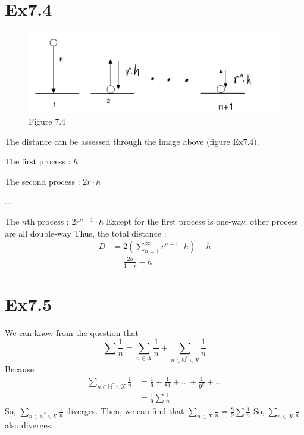 \documentclass[11pt,twoside,a4paper]{article}
\begin{document}
\section{Ex7.4}
\begin{figure}[H]
    \centering
    \includegraphics[scale=0.5]{Ex7.4.png}
    \caption{Figure 7.4}
    \end{figure}
The distance can be assessed through the image above (figure Ex7.4).
\par 
The first process : $h$
\par 
The second process : $2r\cdot h$
\par 
$. . .$
\par 
The $n$th process : $2r^{n-1}\cdot h$
\newline
Except for the first process is one-way, other process are all double-way
Thus, the total distance :
\begin{equation}
    \begin{aligned}
        D&=2(\sum_{n = 1}^{\infty} r^{n-1} \cdot h)-h\\
        &=\frac{2h}{1-r}-h
    \end{aligned}
    \end{equation}

\section{Ex7.5}
We can know from the question that 
$$\displaystyle \sum \frac{1}{n}= \sum _{n\in X} \frac{1}{n} +\sum _{n \in \mathbb{N}^* \backslash X} \frac{1}{n}$$
Because 
\begin{equation}
    \begin{aligned}
        \displaystyle \sum _{n \in \mathbb{N}^* \backslash X} \frac{1}{n} &=
        \frac{1}{9}+\frac{1}{81}+\dots+\frac{1}{9^k}+\dots\\
        &=\frac{1}{9}\sum \frac{1}{n}
    \end{aligned}
    \end{equation}
So, $\displaystyle \sum _{n \in \mathbb{N}^* \backslash X} \frac{1}{n}$ diverges.
\newline
Then, we can find that $\displaystyle\sum _{n\in X} \frac{1}{n}=\frac{8}{9}\sum \frac{1}{n}$
So, $\displaystyle \sum _{n \in X} \frac{1}{n}$ also diverges.
\end{document}
